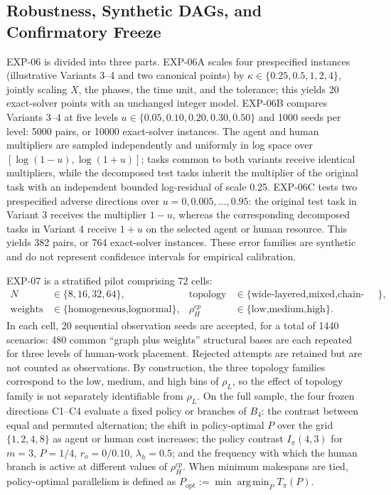 \subsection{Robustness, Synthetic DAGs, and Confirmatory Freeze}

EXP-06 is divided into three parts. EXP-06A scales four prespecified instances
(illustrative Variants 3--4 and two canonical points) by
$\kappa\in\{0.25,0.5,1,2,4\}$, jointly scaling $X$, the phases, the time unit,
and the tolerance; this yields 20 exact-solver points with an unchanged integer
model. EXP-06B compares Variants 3--4 at five levels
$u\in\{0.05,0.10,0.20,0.30,0.50\}$ and 1000 seeds per level: 5000 pairs, or
10000 exact-solver instances. The agent and human multipliers are sampled
independently and uniformly in log space over
$[\log(1-u),\log(1+u)]$; tasks common to both variants receive identical
multipliers, while the decomposed test tasks inherit the multiplier of the
original task with an independent bounded log-residual of scale 0.25. EXP-06C
tests two prespecified adverse directions over
$u=0,0.005,\ldots,0.95$: the original test task in Variant 3 receives the
multiplier $1-u$, whereas the corresponding decomposed tasks in Variant 4
receive $1+u$ on the selected agent or human resource. This yields 382 pairs,
or 764 exact-solver instances. These error families are synthetic and do not
represent confidence intervals for empirical calibration.

EXP-07 is a stratified pilot comprising 72 cells:
\[
\begin{aligned}
N &\in \{8,16,32,64\}, &
\text{topology} &\in \{\text{wide-layered,mixed,chain-like}\},\\
\text{weights} &\in \{\text{homogeneous,lognormal}\}, &
\rho_H^{cp} &\in \{\text{low,medium,high}\}.
\end{aligned}
\]
In each cell, 20 sequential observation seeds are accepted, for a total of 1440
scenarios: 480 common ``graph plus weights'' structural bases are each repeated
for three levels of human-work placement. Rejected attempts are retained but
are not counted as observations. By construction, the three topology families
correspond to the low, medium, and high bins of $\rho_L$, so the effect of
topology family is not separately identifiable from $\rho_L$. On the full
sample, the four frozen directions C1--C4 evaluate a fixed policy or branches of
$B_4$: the contrast between equal and permuted alternation; the shift in
policy-optimal $P$ over the grid $\{1,2,4,8\}$ as agent or human cost increases;
the policy contrast $I_\pi(4,3)$ for $m=3$, $P=1/4$, $r_o=0/0.10$,
$\lambda_h=0.5$; and the frequency with which the human branch is active at
different values of $\rho_H^{cp}$. When minimum makespans are tied,
policy-optimal parallelism is defined as
$P_{\mathrm{opt}}:=\min\operatorname*{arg\,min}_{P}T_\pi(P)$.

